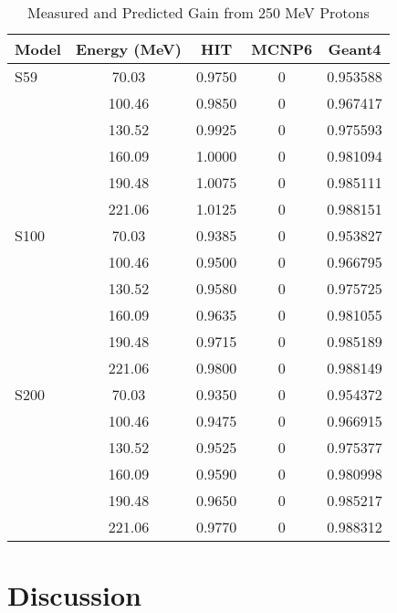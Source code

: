 \documentclass{mc2015}
\begin{document}
\begin{table}
  \centering
  \caption{Measured and Predicted Gain from 250 MeV Protons}
  \begin{tabular}{lcccc}
    \toprule
    Model & Energy (MeV) & HIT & MCNP6 & Geant4 \\
    \midrule
    S59 & 70.03  & \num{0.9750} & \num{0} & \num{0.953588} \\
        & 100.46 & \num{0.9850} & \num{0} & \num{0.967417} \\
        & 130.52 & \num{0.9925} & \num{0} & \num{0.975593} \\
        & 160.09 & \num{1.0000} & \num{0} & \num{0.981094} \\
        & 190.48 & \num{1.0075} & \num{0} & \num{0.985111} \\
        & 221.06 & \num{1.0125} & \num{0} & \num{0.988151} \\
    \midrule
    S100 & 70.03 & \num{0.9385} & \num{0} & \num{0.953827} \\
        & 100.46 & \num{0.9500} & \num{0} & \num{0.966795} \\
        & 130.52 & \num{0.9580} & \num{0} & \num{0.975725} \\
        & 160.09 & \num{0.9635} & \num{0} & \num{0.981055} \\
        & 190.48 & \num{0.9715} & \num{0} & \num{0.985189} \\
        & 221.06 & \num{0.9800} & \num{0} & \num{0.988149} \\
    \midrule
    S200 & 70.03 & \num{0.9350} & \num{0} & \num{0.954372} \\
        & 100.46 & \num{0.9475} & \num{0} & \num{0.966915} \\
        & 130.52 & \num{0.9525} & \num{0} & \num{0.975377} \\
        & 160.09 & \num{0.9590} & \num{0} & \num{0.980998} \\
        & 190.48 & \num{0.9650} & \num{0} & \num{0.985217} \\
        & 221.06 & \num{0.9770} & \num{0} & \num{0.988312} \\
    \bottomrule
  \end{tabular}
  \label{tab:sample}
\end{table}


\section{Discussion}
\end{document}

